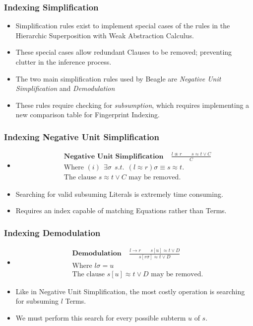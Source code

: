 \documentclass[10pt,xcolor={dvipsnames}]{beamer}
\newcommand{\HSWAC}{Hierarchic Superposition with Weak Abstraction Calculus}
\begin{document}
\begin{NoHyper}
\begin{frame}
  \frametitle{Indexing Simplification}
  \begin{itemize}
  \item<1-> Simplification rules exist to implement special cases of the rules
  in the \HSWAC.
  \item<1-> These special cases allow redundant Clauses to be removed; preventing
  clutter in the inference process.
  \item<2-> The two main simplification rules used by Beagle are \emph{Negative Unit Simplification}
  and \emph{Demodulation}
  \item<3-> These rules require checking for \emph{subsumption}, which requires 
  implementing a new comparison table for Fingerprint Indexing.
  \end{itemize}
\end{frame}

\begin{frame}
  \frametitle{Indexing Negative Unit Simplification}
  \begin{itemize}
  \item<1->[] 
\begin{align*}
&\textbf{Negative Unit Simplification}\ \ \ \ \ \frac{l\not\approx r \quad \quad s \approx t  \lor C}{C}\\
&\text{Where } (i)\ \  \exists \sigma\ \  s.t.\ \  (l \approx r)\sigma \equiv s \approx t.\\
&\text{The clause $s \approx t  \lor C$ may be removed.}
\end{align*}
  \item<2-> Searching for valid subsuming Literals is extremely time consuming.
  \item<2-> Requires an index capable of matching Equations rather than Terms.
  \end{itemize}
\end{frame}

\begin{frame}
  \frametitle{Indexing Demodulation}
  \begin{itemize}
  \item<1->[] 
\begin{align*}
&\textbf{Demodulation}\ \ \ \ \ \frac{l \to r \quad \quad s[u] \approx t  \lor D}{ s[r\sigma] \approx t \lor D}\\
&\text{Where } l\sigma = u\\
&\text{The clause $s[u] \approx t  \lor D$ may be removed.}
\end{align*}
  \item<2-> Like in Negative Unit Simplification, the most costly operation is searching
  for subsuming $l$ Terms.
  \item<2-> We must perform this search for every possible subterm $u$ of $s$.
  \end{itemize}
\end{frame}


\end{NoHyper}
\end{document}
